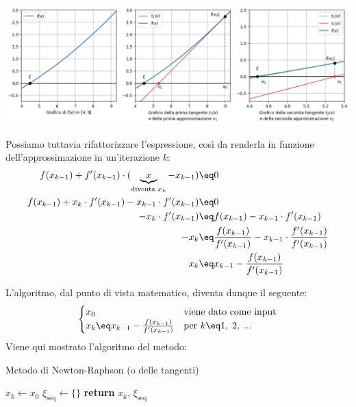 \begin{center}
    \includegraphics[trim=0 0 0 0, clip=false, width=\textwidth]{assets/image-004.png}
\end{center}

Possiamo tuttavia rifattorizzare l'espressione, così da renderla in funzione dell'approssimazione in un'iterazione $k$:
\begin{align*}
    f(x_{k - 1}) + f'(x_{k - 1}) \cdot (\underbrace{x}_{\text{diventa } x_k} - x_{k - 1}) &\eq 0 \\
    f(x_{k - 1}) + x_k \cdot f'(x_{k - 1}) - x_{k - 1} \cdot f'(x_{k - 1}) &\eq 0 \\
    -x_k \cdot f'(x_{k - 1}) &\eq f(x_{k - 1}) - x_{k - 1} \cdot f'(x_{k - 1}) \\
    -x_k &\eq \frac{f(x_{k - 1})}{f'(x_{k - 1})} - x_{k - 1} \cdot \frac{f'(x_{k - 1})}{f'(x_{k - 1})} \\
    x_k &\eq x_{k - 1} - \frac{f(x_{k - 1})}{f'(x_{k - 1})}
\end{align*}

L'algoritmo, dal punto di vista matematico, diventa dunque il seguente:
\[ \begin{cases}
    x_0 & \text{viene dato come input} \\
    x_k \eq x_{k - 1} - \frac{f(x_{k - 1})}{f'(x_{k - 1})} & \text{per } k \eq 1, \; 2, \; ...
\end{cases} \]
\nwl
Viene qui mostrato l'algoritmo del metodo:
\nwl
\begin{algorithm}[H]
    \caption{Metodo di Newton-Raphson (o delle tangenti)}
    $x_k \gets x_0$\;
    $\xi_{\text{seq}} \gets \{\}$\;
    \BlankLine
    \BlankLine
    \textbf{return} $x_k$, $\xi_{\text{seq}}$
\end{algorithm}

